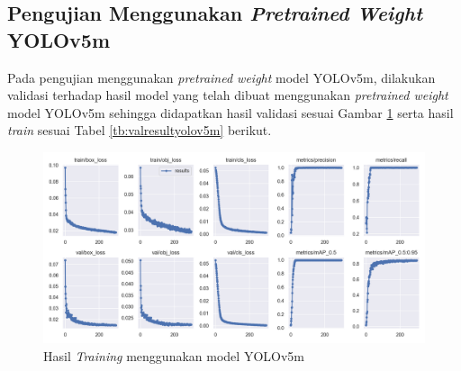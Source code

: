 \subsection{Pengujian Menggunakan \textit{Pretrained Weight} YOLOv5m}
\label{subsec:pengujianyolov5m}

Pada pengujian menggunakan \textit{pretrained weight} model YOLOv5m, dilakukan validasi terhadap hasil model yang telah dibuat menggunakan \textit{pretrained weight} model YOLOv5m sehingga didapatkan hasil validasi sesuai Gambar \ref*{fig:trainresultyolov5m} serta hasil \textit{train} sesuai Tabel \ref*{tb:valresultyolov5m} berikut. \par

\begin{figure}[H]
  \centering
  \includegraphics[scale=0.5]{gambar/yolov5m/train_results.png}
  \caption{Hasil \textit{Training} menggunakan model YOLOv5m}
  \label{fig:trainresultyolov5m}
\end{figure}

